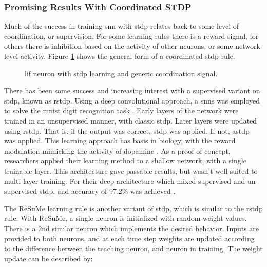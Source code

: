 \documentclass[conference]{IEEEtran}
\newcommand{\afig}[3]{
	\begin{figure}[H]
    	\centering
		\texttt{[image: \#1]}
        \caption{#2.}
        \label{#3}
	\end{figure}
}
\newcommand{\asvgf}[4]{
	\begin{figure}[!htbp]
    	\centering
		\adjustbox{max width=#4\linewidth}{}
        \caption{#2.}
        \label{#3}
	\end{figure}
}
\begin{document}
\subsubsection{Promising Results With Coordinated STDP}
Much of the success in training \gls{snn} with \gls{stdp} relates back to some
level of coordination, or supervision. For some learning rules there is a reward
signal, for others there is inhibition based on the activity of other neurons,
or some network-level activity. Figure \ref{fig:coordinated_stdp} shows the
general form of a coordinated \gls{stdp} rule.

\asvgf{figures/coordinated_stdp.svg}{\gls{lif} neuron with \gls{stdp}
  learning and generic coordination signal}{fig:coordinated_stdp}{0.5}

There has been some success and increasing interest with a supervised variant on
\gls{stdp}, known as \gls{rstdp}. Using a deep convolutional approach, a
\glspl{snn} was employed to solve the \gls{mnist} digit recognition task
\parencite{mozafari_2018}. Early layers of the network were trained in an
unsupervised manner, with classic \gls{stdp}. Later layers were updated using
\gls{rstdp}. That is, if the output was correct, \gls{stdp} was applied. If not,
\gls{astdp} was applied. This learning approach has basis in biology, with the
reward modulation mimicking the activity of dopamine \parencite{mozafari_2018}. As
a proof of concept, researchers applied their learning method to a shallow
network, with a single trainable layer. This architecture gave passable results,
but wasn't well suited to multi-layer training. For their deep architecture
which mixed supervised and un-supervised \gls{stdp}, and accuracy of 97.2\% was
achieved \parencite{mozafari_2018}.



The ReSuMe learning rule is another variant of \gls{stdp}, which is similar to
the \gls{rstdp} rule. With ReSuMe, a single neuron is initialized with random
weight values. There is a 2nd similar neuron which implements the desired
behavior. Inputs are provided to both neurons, and at each time step weights are
updated according to the difference between the teaching neuron, and neuron in
training. The weight update can be described by:
\end{document}

